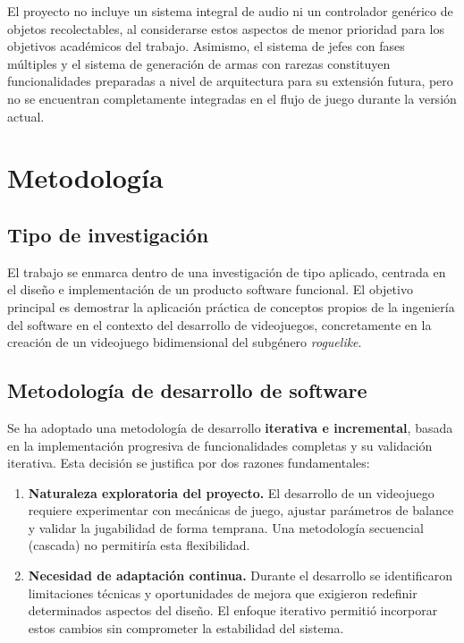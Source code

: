 El proyecto no incluye un sistema integral de audio ni un controlador genérico de objetos recolectables, al considerarse estos aspectos de menor prioridad para los objetivos académicos del trabajo. Asimismo, el sistema de jefes con fases múltiples y el sistema de generación de armas con rarezas constituyen funcionalidades preparadas a nivel de arquitectura para su extensión futura, pero no se encuentran completamente integradas en el flujo de juego durante la versión actual.

\section{Metodología}


\subsection{Tipo de investigación}


El trabajo se enmarca dentro de una investigación de tipo aplicado, centrada en el diseño e implementación de un producto software funcional. El objetivo principal es demostrar la aplicación práctica de conceptos propios de la ingeniería del software en el contexto del desarrollo de videojuegos, concretamente en la creación de un videojuego bidimensional del subgénero \textit{roguelike}.

\subsection{Metodología de desarrollo de software}


Se ha adoptado una metodología de desarrollo \textbf{iterativa e incremental}, basada en la implementación progresiva de funcionalidades completas y su validación iterativa. Esta decisión se justifica por dos razones fundamentales:

\begin{enumerate}
\item \textbf{Naturaleza exploratoria del proyecto.} El desarrollo de un videojuego requiere experimentar con mecánicas de juego, ajustar parámetros de balance y validar la jugabilidad de forma temprana. Una metodología secuencial (cascada) no permitiría esta flexibilidad.
\item \textbf{Necesidad de adaptación continua.} Durante el desarrollo se identificaron limitaciones técnicas y oportunidades de mejora que exigieron redefinir determinados aspectos del diseño. El enfoque iterativo permitió incorporar estos cambios sin comprometer la estabilidad del sistema.
\end{enumerate}

